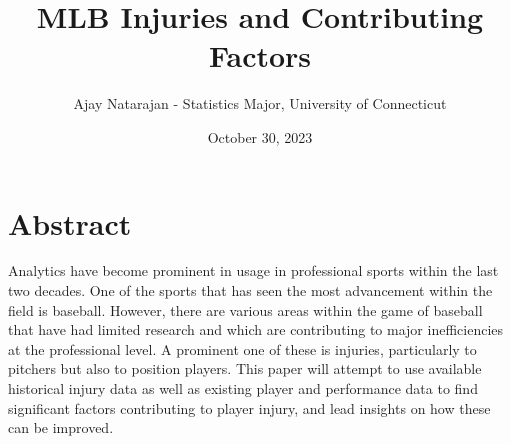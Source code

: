 \documentclass{article}
\title{MLB Injuries and Contributing Factors}
\author{Ajay Natarajan - Statistics Major, University of Connecticut}
\date{October 30, 2023}
\begin{document}
\maketitle

\section{Abstract}
Analytics have become prominent in usage in professional sports within the last two decades. One of the sports that has seen the most advancement within the field is baseball. However, there are various areas within the game of baseball that have had limited research and which are contributing to major inefficiencies at the professional level. A prominent one of these is injuries, particularly to pitchers but also to position players. This paper will attempt to use available historical injury data as well as existing player and performance data to find significant factors contributing to player injury, and lead insights on how these can be improved.
\end{document}
